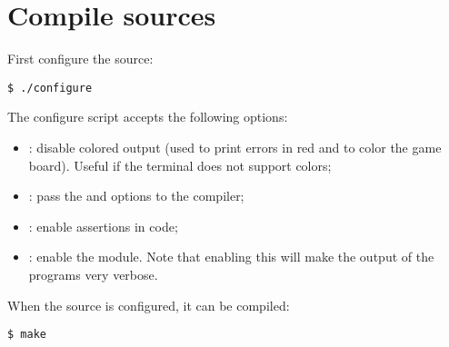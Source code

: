 \section{Compile sources}\label{appendix:howtocompile}

First configure the source:
\begin{verbatim}
$ ./configure
\end{verbatim}

The configure script accepts the following options:
\begin{itemize}
	\item[] : disable colored output (used to print
		errors in red and to color the game board).  Useful if the
		terminal does not support colors;
	\item[] : pass the  and
		 options to the compiler;
	\item[] : enable assertions in code;
	\item[] : enable the  module. Note
		that enabling this will make the output of the programs very
		verbose.
\end{itemize}

When the source is configured, it can be compiled:
\begin{verbatim}
$ make
\end{verbatim}
